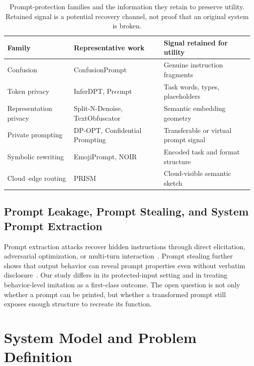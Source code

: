 \documentclass[letterpaper]{article} %
\begin{document}
\begin{table}[t]
\centering
\small
\setlength{\tabcolsep}{3pt}
\begin{tabular}{p{}p{}p{}}
\toprule
Family & Representative work & Signal retained for utility \\
\midrule
Confusion & ConfusionPrompt & Genuine instruction fragments \\
Token privacy & InferDPT, Pr$\epsilon\epsilon$mpt & Task words, types, placeholders \\
Representation privacy & Split-N-Denoise, TextObfuscator & Semantic embedding geometry \\
Private prompting & DP-OPT, Confidential Prompting & Transferable or virtual prompt signal \\
Symbolic rewriting & EmojiPrompt, NOIR & Encoded task and format structure \\
Cloud--edge routing & PRISM & Cloud-visible semantic sketch \\
\bottomrule
\end{tabular}
\caption{Prompt-protection families and the information they retain to preserve utility.  Retained signal is a potential recovery channel, not proof that an original system is broken.}
\label{tab:related_families}
\end{table}

\subsection{Prompt Leakage, Prompt Stealing, and System Prompt Extraction}

Prompt extraction attacks recover hidden instructions through direct elicitation, adversarial optimization, or multi-turn interaction~\citep{zhang2024effective,hui2024pleak,deng2024promptleakage,das2025spe}.  Prompt stealing further shows that output behavior can reveal prompt properties even without verbatim disclosure~\citep{sha2024promptstealing}.  Our study differs in its protected-input setting and in treating behavior-level imitation as a first-class outcome.  The open question is not only whether a prompt can be printed, but whether a transformed prompt still exposes enough structure to recreate its function.

\section{System Model and Problem Definition}
\end{document}
